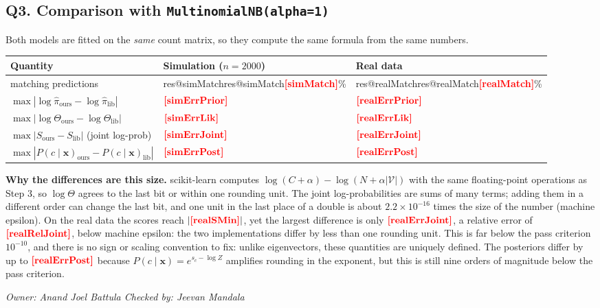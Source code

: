 \documentclass[11pt]{article}
\makeatletter
\newcommand{\fillin}[1]{\textcolor{red}{\textbf{[#1]}}}
\newcommand{\res}[1]{\ifcsname res@#1\endcsname\csname res@#1\endcsname\else\fillin{#1}\fi}
\newcommand{\owner}[2]{\par\noindent\textit{Owner: #1 \hfill Checked by: #2}\par\medskip}
\theoremstyle{plain}
\newcommand{\Vs}{|\mathcal{V}|}
\newcommand{\bx}{\mathbf{x}}
\makeatother
\begin{document}
\subsection{Q3. Comparison with \texttt{MultinomialNB(alpha=1)}}\label{sec:q3}
Both models are fitted on the \emph{same} count matrix, so they compute the same formula from the
same numbers.
\begin{center}
\small
\begin{tabular}{@{}lll@{}}
\toprule
Quantity & Simulation ($n=2000$) & Real data\\
\midrule
matching predictions & \res{simMatch}\% & \res{realMatch}\%\\
$\max|\log\hat\pi_{\text{ours}}-\log\hat\pi_{\text{lib}}|$ & $\res{simErrPrior}$ & $\res{realErrPrior}$\\
$\max|\log\Theta_{\text{ours}}-\log\Theta_{\text{lib}}|$ & $\res{simErrLik}$ & $\res{realErrLik}$\\
$\max|S_{\text{ours}}-S_{\text{lib}}|$ (joint log-prob) & $\res{simErrJoint}$ & $\res{realErrJoint}$\\
$\max|P(c\mid\bx)_{\text{ours}}-P(c\mid\bx)_{\text{lib}}|$ & $\res{simErrPost}$ & $\res{realErrPost}$\\
\bottomrule
\end{tabular}
\end{center}
\textbf{Why the differences are this size.} scikit-learn computes
$\log(C+\alpha)-\log(N+\alpha\Vs)$ with the same floating-point operations as Step 3, so $\log\Theta$
agrees to the last bit or within one rounding unit. The joint log-probabilities are sums of many
terms; adding them in a different order can change the last bit, and one unit in the last place of a
double is about $2.2\times10^{-16}$ times the size of the number (machine epsilon). On the real data
the scores reach $|\res{realSMin}|$, yet the largest difference is only $\res{realErrJoint}$, a relative
error of $\res{realRelJoint}$, below machine epsilon: the two implementations differ by less than one
rounding unit. This is far below the pass criterion $10^{-10}$, and there is no sign or scaling
convention to fix: unlike eigenvectors, these quantities are uniquely defined. The posteriors differ by up to
$\res{realErrPost}$ because $P(c\mid\bx)=e^{s_c-\log Z}$ amplifies rounding in the exponent, but this
is still nine orders of magnitude below the pass criterion.
\owner{Anand Joel Battula}{Jeevan Mandala}

\end{document}
